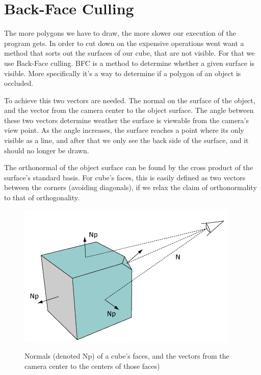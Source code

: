 \section{Back-Face Culling} The more polygons we have to draw, the more slower
our execution of the program gets. In order to cut down on the expensive
operations went want a method that sorts out the surfaces of our cube, that are
not visible. For that we use Back-Face culling. BFC is a method to determine
whether a given surface is visible. More specifically it's a way to determine
if a polygon of an object is occluded.

To achieve this two vectors are needed. The normal on the surface of the object,
and the vector from the camera center to the object surface. The angle between
these two vectors determine weather the surface is viewable from the camera's
view point. As the angle increases, the surface reaches a point where its only
visible as a line, and after that we only see the back side of the surface, and
it should no longer be drawn.

The orthonormal of the object surface can be found by the cross product of the
surface's standard basis. For cube's faces, this is easily defined as two
vectors between the corners (avoiding diagonals), if we relax the claim of
orthonormality to that of orthogonality.
\begin{figure}[hbtp]
\includegraphics{pics/culling.png}
\label{fig:culing}
\caption{Normals (denoted Np) of a cube's faces, and the vectors from the camera
center to the centers of those faces)}
\end{figure}
